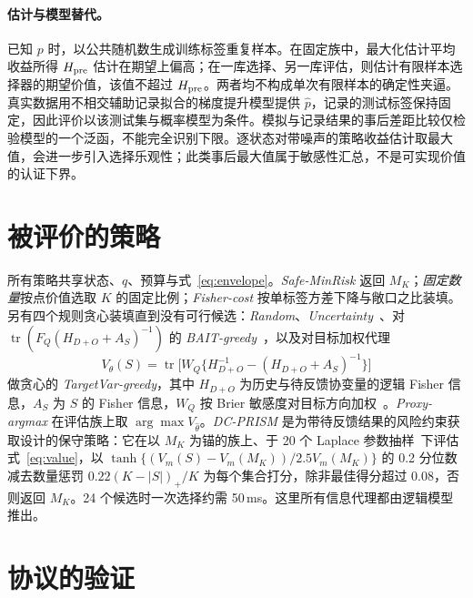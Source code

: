 \documentclass[runningheads]{llncs}
\begin{document}
\paragraph{估计与模型替代。}已知 $p$ 时，以公共随机数生成训练标签重复样本。在固定族中，最大化估计平均收益所得 $H_{\rm pre}$ 估计在期望上偏高；在一库选择、另一库评估，则估计有限样本选择器的期望价值，该值不超过 $H_{\rm pre}$。两者均不构成单次有限样本的确定性夹逼。真实数据用不相交辅助记录拟合的梯度提升模型提供 $\hat p$，记录的测试标签保持固定，因此评价以该测试集与概率模型为条件。模拟与记录结果的事后差距比较仅检验模型的一个泛函，不能完全识别下限。逐状态对带噪声的策略收益估计取最大值，会进一步引入选择乐观性；此类事后最大值属于敏感性汇总，不是可实现价值的认证下界。

\section{被评价的策略}
\label{sec:policy}
所有策略共享状态、$q$、预算与式~\eqref{eq:envelope}。\emph{Safe-MinRisk} 返回 $M_K$；\emph{固定数量}按点价值选取 $K$ 的固定比例；\emph{Fisher-cost} 按单标签方差下降与敞口之比装填。另有四个规则贪心装填直到没有可行候选：\emph{Random}、\emph{Uncertainty}~\cite{lewis1994sequential}、对 $\operatorname{tr}(F_Q(H_{D+O}+A_S)^{-1})$ 的 \emph{BAIT-greedy}~\cite{ash2021fishing}，以及对目标加权代理
\begin{equation}
 V_\theta(S)=\operatorname{tr}\big[W_Q\{H_{D+O}^{-1}-(H_{D+O}+A_S)^{-1}\}\big]\label{eq:value}
\end{equation}
做贪心的 \emph{TargetVar-greedy}，其中 $H_{D+O}$ 为历史与待反馈协变量的逻辑 Fisher 信息，$A_S$ 为 $S$ 的 Fisher 信息，$W_Q$ 按 Brier 敏感度对目标方向加权~\cite{yu2006transductive,bickfordsmith2023prediction}。\emph{Proxy-argmax} 在评估族上取 $\arg\max V_{\hat\theta}$。\emph{DC-PRISM} 是为带待反馈结果的风险约束获取设计的保守策略：它在以 $M_K$ 为锚的族上、于 20 个 Laplace 参数抽样~\cite{mackay1992practical}下评估式~\eqref{eq:value}，以 $\tanh\{(V_m(S)-V_m(M_K))/2.5V_m(M_K)\}$ 的 0.2 分位数减去数量惩罚 $0.22(K-|S|)_+/K$ 为每个集合打分，除非最佳得分超过 $0.08$，否则返回 $M_K$。24 个候选时一次选择约需 50\,ms。这里所有信息代理都由逻辑模型推出。

\section{协议的验证}
\label{sec:validation}
\end{document}
